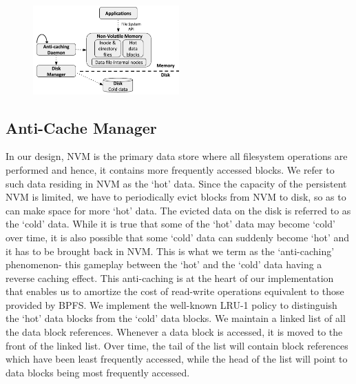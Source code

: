 \begin{figure}
\centering
\vspace{-0.2in}
\includegraphics[width=0.5\textwidth]{figs/bpfs.pdf}
\vspace{-0.2in}
\end{figure}


\subsection{Anti-Cache Manager}
In our design, NVM is the primary data store where all filesystem operations are performed and hence, it contains more frequently accessed blocks. We refer to such data residing in NVM as the `hot' data. Since the capacity of the persistent NVM is limited, we have to periodically evict blocks from NVM to disk, so as to can make space for more `hot' data. The evicted data on the disk is referred to as the `cold' data. While it is true that some of the `hot' data may become `cold' over time, it is also possible that some `cold' data can suddenly become `hot' and it has to be brought back in NVM. This is what we term as the `anti-caching' phenomenon- this gameplay between the `hot' and the `cold' data having a reverse caching effect. This anti-caching is at the heart of our implementation that enables us to amortize the cost of read-write operations equivalent to those provided by BPFS. We implement the well-known LRU-1 policy to distinguish the `hot' data blocks from the `cold' data blocks. We maintain a linked list of all the data block references. Whenever a data block is accessed, it is moved to the front of the linked list. Over time, the tail of the list will contain block references which have been least frequently accessed, while the head of the list will point to data blocks being most frequently accessed.

